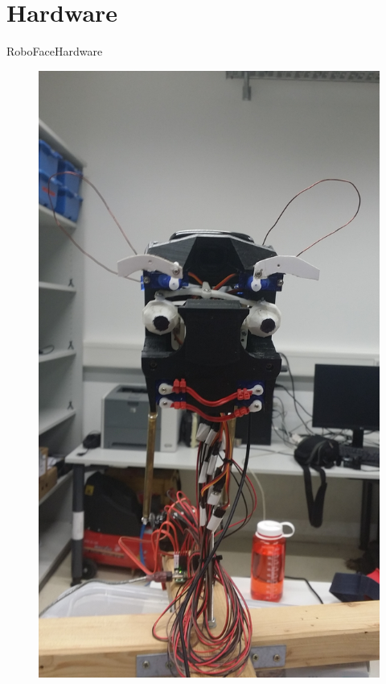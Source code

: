 \documentclass{beamer}
\begin{document}
\section{Hardware}
\begin{frame}{RoboFace}{Hardware}
	\begin{figure}
		\centering
        \includegraphics[width=\textwidth,height=\textheight,keepaspectratio]{figures/RoboFaceNeutral.jpg}
		\label{fig:RoboFaceNeutral}
	\end{figure}
\end{frame}
\end{document}
